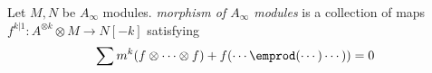 
 
 
Let $M, N$ be $A_\infty$ modules.  \emph{morphism of $A_\infty$ modules} is a collection of maps $f^{k|1}: A^{\otimes k}\otimes M\to N[-k]$ satisfying 
\[\sum m^k (f\otimes \cdots \otimes f )+f(\cdots \emprod(\cdots)\cdots))=0\]


 